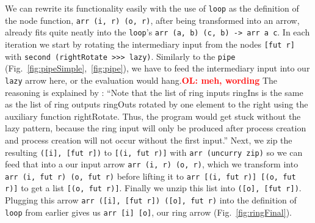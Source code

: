\documentclass{jfp1}
\newcommand{\inlinecode}[1]{\texttt{#1}}
\newcommand{\comm}[2]{\textcolor{red}{\bfseries #1: #2}}
\newcommand{\olcomment}[1]{\comm{OL}{#1}}
\begin{document}
We can rewrite its functionality easily with the use of \inlinecode{loop} as the definition of the node function, \inlinecode{arr (i, r) (o, r)}, after being transformed into an arrow, already fits quite neatly into the \inlinecode{loop}'s \inlinecode{arr (a, b) (c, b) -> arr a c}. In each iteration we start by rotating the intermediary input from the nodes \inlinecode{[fut r]} with \inlinecode{second (rightRotate >>> lazy)}. Similarly to the \inlinecode{pipe} (Fig.~\ref{fig:pipeSimple},~\ref{fig:pipe}), we have to feed the intermediary input into our \inlinecode{lazy} arrow here, or the evaluation would hang.\olcomment{meh, wording} The reasoning is explained by \citet{Loogen2012}:
\enquote{Note that the list of ring inputs ringIns is the same as the list of ring outputs ringOuts rotated by one element to the right using the auxiliary function rightRotate. Thus, the program would get stuck without the lazy pattern, because the ring input will only be produced after process creation and process creation will not occur without the first input.}
Next, we zip the resulting \inlinecode{([i], [fut r])} to \inlinecode{[(i, fut r)]} with \inlinecode{arr (uncurry zip)} so we can feed that into a our input arrow \inlinecode{arr (i, r) (o, r)}, which we transform into \inlinecode{arr (i, fut r) (o, fut r)} before lifting it to \inlinecode{arr [(i, fut r)] [(o, fut r)]} to get a list \inlinecode{[(o, fut r)]}. Finally we unzip this list into \inlinecode{([o], [fut r])}. Plugging this arrow \inlinecode{arr ([i], [fut r]) ([o], fut r)} into the definition of \inlinecode{loop} from earlier gives us \inlinecode{arr [i] [o]}, our ring arrow (Fig.~\ref{fig:ringFinal}).
\end{document}
